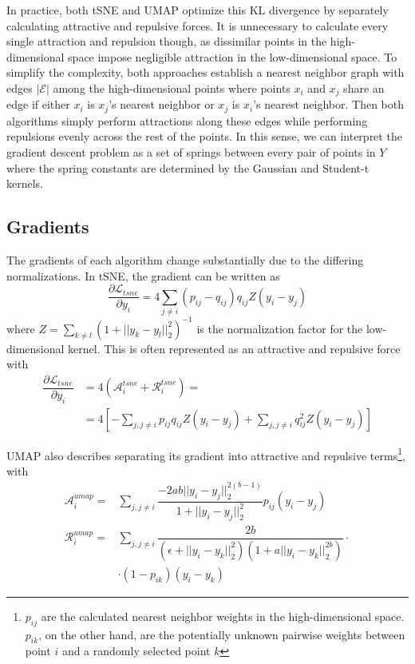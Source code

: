 \documentclass[sigconf, nonacm]{acmart}
\begin{document}
In practice, both tSNE and UMAP optimize this KL divergence by separately calculating attractive and repulsive forces. It is unnecessary to calculate
every single attraction and repulsion though, as dissimilar points in the high-dimensional space impose negligible attraction in the low-dimensional space.
To simplify the complexity, both approaches establish a nearest neighbor graph \cite{van2014accelerating} with edges $|\mathcal{E}|$ among the
high-dimensional points where points $x_i$ and $x_j$ share an edge if either $x_i$ is $x_j$'s nearest neighbor or $x_j$ is $x_i$'s nearest neighbor.
Then both algorithms simply perform attractions along these edges while performing repulsions evenly across the rest of the points. In this sense, we can
interpret the gradient descent problem as a set of springs between every pair of points in $Y$ where the spring constants are determined by the Gaussian and
Student-t kernels.

\subsection{Gradients}

The gradients of each algorithm change substantially due to the differing normalizations. In tSNE, the gradient can be written as
\begin{equation}
    \dfrac{\partial \mathcal{L}_{tsne}}{\partial y_i} = 4 \sum_{j \neq i} (p_{ij} - q_{ij}) q_{ij} Z (y_i - y_j)
\end{equation}
where $Z = \sum_{k \neq l} (1 + ||y_k - y_l||_2^2)^{-1}$ is the normalization factor for the low-dimensional kernel. This is often represented as an attractive
and repulsive force with
\begin{align*}
    \dfrac{\partial \mathcal{L}_{tsne}}{\partial y_i} &= 4(\mathcal{A}_i^{tsne} + \mathcal{R}_i^{tsne}) = \\
    &= 4 \left[ - \sum_{j, j \neq i} p_{ij}q_{ij}Z (y_i - y_j) + \sum_{j, j \neq i} q_{ij}^2 Z (y_i - y_j) \right]
\end{align*}

UMAP also describes separating its gradient into attractive and repulsive terms\footnote{$p_{ij}$ are the calculated nearest neighbor weights in the
high-dimensional space. $p_{ik}$, on the other hand, are the potentially unknown pairwise weights between point $i$ and a randomly selected point $k$}, with
\begin{align}
    \mathcal{A}_i^{umap} = & \sum_{j, j \neq i} \dfrac{-2ab||y_i - y_j||_2^{2(b-1)}}{1 + ||y_i - y_j||_2^2} p_{ij} (y_i - y_j) \label{umap_attr} \\
    \mathcal{R}_i^{umap} = & \sum_{j, j \neq i} \dfrac{2b}{(\epsilon + ||y_i - y_k||_2^2)(1 + a ||y_i - y_k||_2^{2b})} \cdot \label{umap_rep} \\
    &\cdot (1 - p_{ik}) (y_i - y_k) \nonumber
\end{align}
\end{document}
